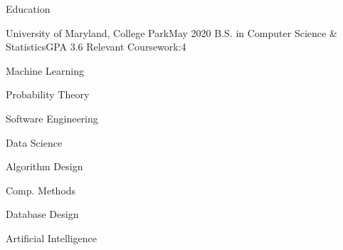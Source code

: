 \documentclass{resume} %
\begin{document}

\begin{rSection}{Education}

\begin{rColumnSubsection}{University of Maryland, College Park}{May 2020}
{B.S. in Computer Science \& Statistics}{GPA 3.6}
{Relevant Coursework:}{4}
\item Machine Learning
\item Probability Theory
\item Software Engineering
\item Data Science
\item Algorithm Design
\item Comp. Methods
\item Database Design
\item Artificial Intelligence
\end{rColumnSubsection}

\end{rSection}

\end{document}
